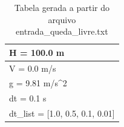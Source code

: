 \begin{table}
\caption{Tabela gerada a partir do arquivo entrada\_queda\_livre.txt}
\label{tab:entrada_queda_livre}
\begin{tabular}{l}
\toprule
H = 100.0 m \\
\midrule
V = 0.0 m/s \\
g = 9.81 m/s\^{}2 \\
dt = 0.1 s \\
dt\_list = [1.0, 0.5, 0.1, 0.01] \\
\bottomrule
\end{tabular}
\end{table}
